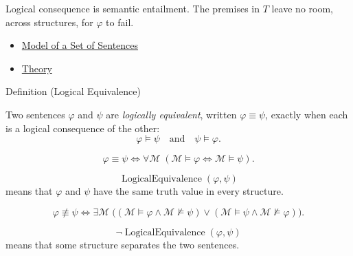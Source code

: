 \begin{remark*}[Interpretation]
Logical consequence is semantic entailment. The premises in \(T\) leave no
room, across structures, for \(\varphi\) to fail.
\end{remark*}

\begin{dependencies}
\begin{itemize}
  \item \hyperref[def:model-theory-set]{Model of a Set of Sentences}
  \item \hyperref[def:theory]{Theory}
\end{itemize}
\end{dependencies}

\begin{definitionbox}{Definition (Logical Equivalence)}
\begin{definition}
\label{def:log-equiv}
Two sentences \(\varphi\) and \(\psi\) are \emph{logically equivalent}, written
\(\varphi\equiv\psi\), exactly when each is a logical consequence of the other:
\[
\varphi\models\psi
\quad\text{and}\quad
\psi\models\varphi.
\]
\end{definition}
\end{definitionbox}

\begin{remark*}
\[
\varphi\equiv\psi
\Longleftrightarrow
\forall \mathcal M\;(\mathcal M\models\varphi \Longleftrightarrow \mathcal M\models\psi).
\]
\end{remark*}

\begin{remark*}
\[
  \operatorname{LogicalEquivalence}(\varphi,\psi)
\] means that \(\varphi\) and
\(\psi\) have the same truth value in every structure.
\end{remark*}

\begin{remark*}
\[
\varphi\not\equiv\psi
\Longleftrightarrow
\exists \mathcal M\;\bigl((\mathcal M\models\varphi \land \mathcal M\not\models\psi)
\lor
(\mathcal M\models\psi \land \mathcal M\not\models\varphi)\bigr).
\]
\end{remark*}

\begin{remark*}
\[
  \neg\operatorname{LogicalEquivalence}(\varphi,\psi)
\] means that some
structure separates the two sentences.
\end{remark*}

